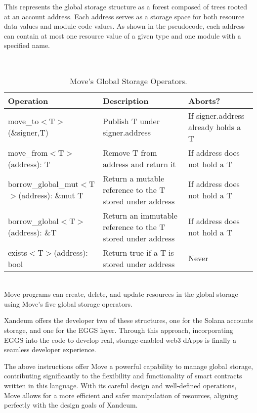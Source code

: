 \documentclass[11pt]{article}   	%
\begin{document}
This represents the global storage structure as a forest composed of trees rooted at an account address. Each address serves as a storage space for both resource data values and module code values. As shown in the pseudocode, each address can contain at most one resource value of a given type and one module with a specified name.

\ \\
\phantom{~}
\begin{table}[!h]
\begin{center}
\begin{tabular}{p{}p{}p{}}
\hline
\textbf{Operation} & \textbf{Description} & \textbf{Aborts?} \\ \hline
move\_to$<$T$>$(\&signer,T) & Publish T under signer.address & If signer.address already holds a T \\ \hline
move\_from$<$T$>$(address): T & Remove T from address and return it & If address does not hold a T \\ \hline
borrow\_global\_mut$<$T$>$(address): \&mut T & Return a mutable reference to the T stored under address & If address does not hold a T \\ \hline
borrow\_global$<$T$>$(address): \&T & Return an immutable reference to the T stored under address & If address does not hold a T \\ \hline
exists$<$T$>$(address): bool & Return true if a T is stored under address & Never \\ \hline
\end{tabular}
\caption{\label{movesto}Move's Global Storage Operators.}
\end{center}
\end{table}
\ \\
Move programs can create, delete, and update resources in the global storage using Move's five global storage operators.

Xandeum offers the developer two of these structures, one for the Solana accounts storage, and one for the EGGS layer. Through this approach, incorporating EGGS into the code to develop real, storage-enabled web3 dApps is finally a seamless developer experience.

The above instructions offer Move a powerful capability to manage global storage, contributing significantly to the flexibility and functionality of smart contracts written in this language. With its careful design and well-defined operations, Move allows for a more efficient and safer manipulation of resources, aligning perfectly with the design goals of Xandeum.
\end{document}
